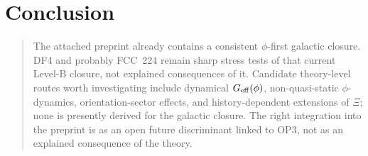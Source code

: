 \documentclass[11pt]{article}
\begin{document}
\section{Conclusion}

\begin{quote}
The attached preprint already contains a consistent $\phi$-first
galactic closure. DF4 and probably FCC~224 remain sharp stress tests
of that current Level-B closure, not explained consequences of it.
Candidate theory-level routes worth investigating include dynamical
$G_{\rm eff}(\phi)$, non-quasi-static $\phi$-dynamics,
orientation-sector effects, and history-dependent extensions of $\Xi$;
none is presently derived for the galactic closure. The right
integration into the preprint is as an open future discriminant
linked to OP3, not as an explained consequence of the theory.
\end{quote}



\end{document}
